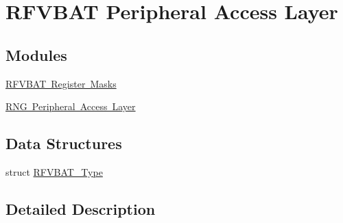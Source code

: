 \hypertarget{group___r_f_v_b_a_t___peripheral___access___layer}{}\section{R\+F\+V\+B\+AT Peripheral Access Layer}
\label{group___r_f_v_b_a_t___peripheral___access___layer}
\subsection*{Modules}
\begin{DoxyCompactItemize}
\item 
\mbox{\hyperlink{group___r_f_v_b_a_t___register___masks}{R\+F\+V\+B\+A\+T Register Masks}}
\item 
\mbox{\hyperlink{group___r_n_g___peripheral___access___layer}{R\+N\+G Peripheral Access Layer}}
\end{DoxyCompactItemize}
\subsection*{Data Structures}
\begin{DoxyCompactItemize}
\item 
struct \mbox{\hyperlink{struct_r_f_v_b_a_t___type}{R\+F\+V\+B\+A\+T\+\_\+\+Type}}
\end{DoxyCompactItemize}


\subsection{Detailed Description}
